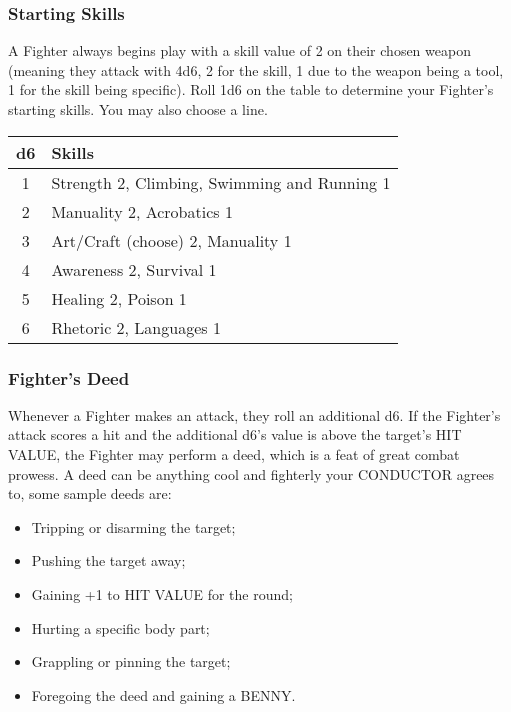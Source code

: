 \begin{multicols}{2}
\subsubsection*{Starting Skills}
A Fighter always begins play with a skill value of 2 on their chosen weapon (meaning they attack with 4d6, 2 for the skill, 1 due to the weapon being a tool, 1 for the skill being specific). Roll 1d6 on the table to determine your Fighter's starting skills. You may also choose a line.
\begin{adjustbox}{width=\columnwidth,center}
\begin{tabular}{|c|l|}
\hline
\textbf{d6} & \textbf{Skills} \\
\hline
1 & Strength 2, Climbing, Swimming and Running 1 \\
2 & Manuality 2, Acrobatics 1 \\
3 & Art/Craft (choose) 2, Manuality 1 \\
4 & Awareness 2, Survival 1 \\
5 & Healing 2, Poison 1 \\
6 & Rhetoric 2, Languages 1 \\
\hline
\end{tabular}
\end{adjustbox}

\subsubsection*{Fighter's Deed}
Whenever a Fighter makes an attack, they roll an additional d6. If the Fighter's attack scores a hit and the additional d6's value is above the target's HIT VALUE, the Fighter may perform a deed, which is a feat of great combat prowess. A deed can be anything cool and fighterly your CONDUCTOR agrees to, some sample deeds are:
\begin{itemize}
    \item Tripping or disarming the target;
    \item Pushing the target away;
    \item Gaining +1 to HIT VALUE for the round;
    \item Hurting a specific body part;
    \item Grappling or pinning the target;
    \item Foregoing the deed and gaining a BENNY.
\end{itemize}

\end{multicols}

